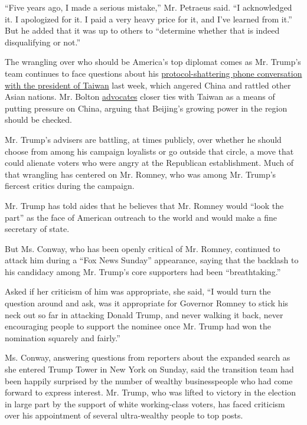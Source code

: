 ``Five years ago, I made a serious mistake,'' Mr. Petraeus said. ``I
acknowledged it. I apologized for it. I paid a very heavy price for it,
and I've learned from it.'' But he added that it was up to others to
``determine whether that is indeed disqualifying or not.''

The wrangling over who should be America's top diplomat comes as Mr.
Trump's team continues to face questions about his
\href{http://www.nytimes.com/2016/12/02/us/politics/trump-speaks-with-taiwans-leader-a-possible-affront-to-china.html}{protocol-shattering
phone conversation with the president of Taiwan} last week, which
angered China and rattled other Asian nations. Mr. Bolton
\href{http://www.wsj.com/articles/the-u-s-can-play-a-taiwan-card-1453053872}{advocates}
closer ties with Taiwan as a means of putting pressure on China, arguing
that Beijing's growing power in the region should be checked.

Mr. Trump's advisers are battling, at times publicly, over whether he
should choose from among his campaign loyalists or go outside that
circle, a move that could alienate voters who were angry at the
Republican establishment. Much of that wrangling has centered on Mr.
Romney, who was among Mr. Trump's fiercest critics during the campaign.

Mr. Trump has told aides that he believes that Mr. Romney would ``look
the part'' as the face of American outreach to the world and would make
a fine secretary of state.

But Ms. Conway, who has been openly critical of Mr. Romney, continued to
attack him during a ``Fox News Sunday'' appearance, saying that the
backlash to his candidacy among Mr. Trump's core supporters had been
``breathtaking.''

Asked if her criticism of him was appropriate, she said, ``I would turn
the question around and ask, was it appropriate for Governor Romney to
stick his neck out so far in attacking Donald Trump, and never walking
it back, never encouraging people to support the nominee once Mr. Trump
had won the nomination squarely and fairly.''

Ms. Conway, answering questions from reporters about the expanded search
as she entered Trump Tower in New York on Sunday, said the transition
team had been happily surprised by the number of wealthy businesspeople
who had come forward to express interest. Mr. Trump, who was lifted to
victory in the election in large part by the support of white
working-class voters, has faced criticism over his appointment of
several ultra-wealthy people to top posts.

